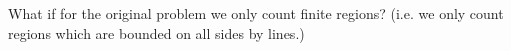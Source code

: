 What if for the original problem we only count finite regions?
(i.e. we only count regions which are bounded on all sides by lines.)
